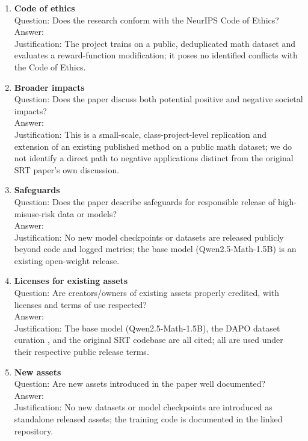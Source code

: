 \documentclass{article}
\begin{document}
\begin{enumerate}
\item \textbf{Code of ethics}\\
    Question: Does the research conform with the NeurIPS Code of Ethics?\\
    Answer: \answerYes{}\\
    Justification: The project trains on a public, deduplicated math
    dataset and evaluates a reward-function modification; it poses no
    identified conflicts with the Code of Ethics.

\item \textbf{Broader impacts}\\
    Question: Does the paper discuss both potential positive and negative
    societal impacts?\\
    Answer: \answerNo{}\\
    Justification: This is a small-scale, class-project-level replication
    and extension of an existing published method on a public math dataset;
    we do not identify a direct path to negative applications distinct from
    the original SRT paper's own discussion.

\item \textbf{Safeguards}\\
    Question: Does the paper describe safeguards for responsible release of
    high-misuse-risk data or models?\\
    Answer: \answerNA{}\\
    Justification: No new model checkpoints or datasets are released
    publicly beyond code and logged metrics; the base model (Qwen2.5-Math-1.5B)
    is an existing open-weight release.

\item \textbf{Licenses for existing assets}\\
    Question: Are creators/owners of existing assets properly credited,
    with licenses and terms of use respected?\\
    Answer: \answerYes{}\\
    Justification: The base model (Qwen2.5-Math-1.5B), the DAPO dataset
    curation \citep{yu2025dapo}, and the original SRT codebase
    \citep{shafayat2025srt} are all cited; all are used under their
    respective public release terms.

\item \textbf{New assets}\\
    Question: Are new assets introduced in the paper well documented?\\
    Answer: \answerNA{}\\
    Justification: No new datasets or model checkpoints are introduced as
    standalone released assets; the training code is documented in the
    linked repository.


\end{enumerate}
\end{document}
